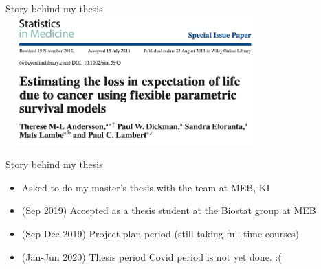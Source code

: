 \documentclass{beamer}
\begin{document}
\begin{frame}{Story behind my thesis}
\includegraphics[width=10cm,height=5cm]{image/Andersson_2013}
\end{frame}


\begin{frame}{Story behind my thesis}
\begin{itemize}
	\item<1->  Asked to do my master's thesis with the team at MEB, KI
	\item<2->  (Sep 2019) Accepted as a thesis student at the Biostat group at MEB 
	\item<3->  (Sep-Dec 2019) Project plan period (still taking full-time courses) 
	\item<4>   (Jan-Jun 2020) Thesis period \st{Covid period is not yet done. :(}
\end{itemize}
\end{frame}

\end{document}
